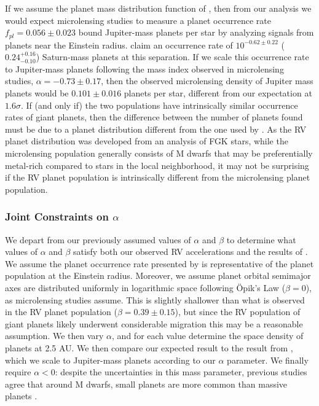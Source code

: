 If we assume the planet mass distribution function of \citet{Cumming08}, then from our analysis we would expect microlensing studies to measure a planet occurrence rate $f_{pl} = 0.056 \pm 0.023$ bound Jupiter-mass planets per star by analyzing signals from planets near the Einstein radius. \citet{Cassan12} claim an occurrence rate of $10^{-0.62\pm0.22}$ ($0.24^{+0.16}_{-0.10}$) Saturn-mass planets at this separation. If we scale this occurrence rate to Jupiter-mass planets following the mass index observed in microlensing studies, $\alpha = -0.73 \pm 0.17$, then the observed microlensing density of Jupiter mass planets would be $0.101 \pm 0.016$ planets per star, different from our expectation at $1.6\sigma$.  If (and only if) the two populations have intrinsically similar occurrence rates of giant planets, then the difference between the number of planets found must be due to a planet distribution different from the one used by \citet{Cumming08}. As the RV planet distribution was developed from an analysis of FGK stars, while the microlensing population generally consists of M dwarfs that may be preferentially metal-rich compared to stars in the local neighborhood, it may not be surprising if the RV planet population is intrinsically different from the microlensing planet population.

\subsubsection{Joint Constraints on $\alpha$}

We depart from our previously assumed values of $\alpha$ and $\beta$ to determine what values of $\alpha$ and $\beta$ satisfy both our observed RV accelerations and the results of \citet{Cassan12}. We assume the planet occurrence rate presented by \citet{Cassan12} is representative of the planet population at the Einstein radius. Moreover, we assume planet orbital semimajor axes are distributed uniformly in logarithmic space following \"Opik's Law ($\beta = 0$), as microlensing studies assume. This is slightly shallower than what is observed in the RV planet population ($\beta = 0.39 \pm 0.15$), but since the RV population of giant planets likely underwent considerable migration this may be a reasonable assumption. We then vary $\alpha$, and for each value determine the space density of planets at 2.5 AU. We then compare our expected result to the result from \citet{Cassan12}, which we scale to Jupiter-mass planets according to our $\alpha$ parameter. We finally require $\alpha < 0$: despite the uncertainties in this mass parameter, previous studies agree that around M dwarfs, small planets are more common than massive planets \citep{Swift13, Morton14}. 


